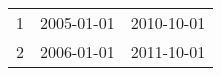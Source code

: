 % 
\begin{tabular}{ccc}
  \hline
  \hline
1 & 2005-01-01 & 2010-10-01 \\ 
  2 & 2006-01-01 & 2011-10-01 \\ 
   \hline
\end{tabular}
